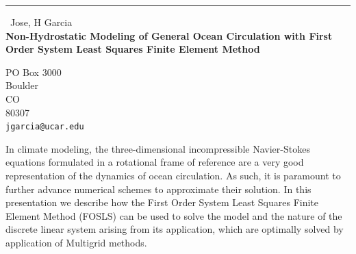 \documentclass{report}
\begin{document}
\begin{center}
\rule{6in}{1pt} \
{\large Jose, H Garcia \\
{\bf Non-Hydrostatic Modeling of General Ocean Circulation with First Order System Least Squares Finite Element Method }}

PO Box 3000 \\ Boulder \\ CO \\ 80307
\\
{\tt jgarcia@ucar.edu}\end{center}

In climate modeling, the three-dimensional incompressible Navier-Stokes
equations formulated in a rotational frame of reference are a very good
representation of the dynamics of ocean circulation. As such, it is
paramount to further advance numerical schemes to approximate their
solution. In this presentation we describe how the First Order System
Least Squares Finite Element Method (FOSLS) can be used to solve the
model and the nature of the discrete linear system arising from its
application, which are optimally solved by application of Multigrid
methods.
\end{document}
